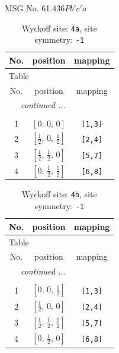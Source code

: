 \documentclass[fleqn,8pt]{jsarticle}
\begin{document}
\setcounter{MaxMatrixCols}{32}

\renewcommand{\tablename}{Table~}
\renewcommand{\figurename}{Figure~}
\begin{center}
\LARGE
MSG No. 61.436\quad$Pb'c'a$
\end{center}
\renewcommand{\arraystretch}{1.2}
\begin{longtable}{ccc}
\caption{Wyckoff site: {\tt 4a}, site symmetry: {\tt -1}}
 \\
 \hline \hline
No. & position & mapping \\ \hline \endfirsthead

\multicolumn{2}{l}{\tablename\ \thetable{}} \\
 \hline \hline
No. & position & mapping \\ \hline \endhead

 \hline \hline
\multicolumn{2}{r}{\footnotesize\it continued ...} \\ \endfoot

 \hline \hline
\multicolumn{2}{r}{} \\ \endlastfoot

1 & $\left[ 0,\, 0,\, 0 \right]$ & {\tt [1,3]} \\ \hline
2 & $\left[ \frac{1}{2},\, 0,\, \frac{1}{2} \right]$ & {\tt [2,4]} \\ \hline
3 & $\left[ \frac{1}{2},\, \frac{1}{2},\, 0 \right]$ & {\tt [5,7]} \\ \hline
4 & $\left[ 0,\, \frac{1}{2},\, \frac{1}{2} \right]$ & {\tt [6,8]} \\
\end{longtable}
\renewcommand{\arraystretch}{1.2}
\begin{longtable}{ccc}
\caption{Wyckoff site: {\tt 4b}, site symmetry: {\tt -1}}
 \\
 \hline \hline
No. & position & mapping \\ \hline \endfirsthead

\multicolumn{2}{l}{\tablename\ \thetable{}} \\
 \hline \hline
No. & position & mapping \\ \hline \endhead

 \hline \hline
\multicolumn{2}{r}{\footnotesize\it continued ...} \\ \endfoot

 \hline \hline
\multicolumn{2}{r}{} \\ \endlastfoot

1 & $\left[ 0,\, 0,\, \frac{1}{2} \right]$ & {\tt [1,3]} \\ \hline
2 & $\left[ \frac{1}{2},\, 0,\, 0 \right]$ & {\tt [2,4]} \\ \hline
3 & $\left[ \frac{1}{2},\, \frac{1}{2},\, \frac{1}{2} \right]$ & {\tt [5,7]} \\ \hline
4 & $\left[ 0,\, \frac{1}{2},\, 0 \right]$ & {\tt [6,8]} \\
\end{longtable}
\end{document}
